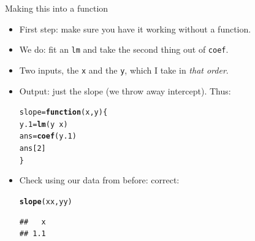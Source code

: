 \documentclass[unknownkeysallowed]{beamer}\usepackage[]{graphicx}\usepackage[]{color}
\makeatletter
\newcommand{\hlnum}[1]{\textcolor[rgb]{0.686,0.059,0.569}{#1}}%
\newcommand{\hlopt}[1]{\textcolor[rgb]{0,0,0}{#1}}%
\newcommand{\hlstd}[1]{\textcolor[rgb]{0.345,0.345,0.345}{#1}}%
\newcommand{\hlkwa}[1]{\textcolor[rgb]{0.161,0.373,0.58}{\textbf{#1}}}%
\newcommand{\hlkwb}[1]{\textcolor[rgb]{0.69,0.353,0.396}{#1}}%
\newcommand{\hlkwc}[1]{\textcolor[rgb]{0.333,0.667,0.333}{#1}}%
\newcommand{\hlkwd}[1]{\textcolor[rgb]{0.737,0.353,0.396}{\textbf{#1}}}%
\newenvironment{kframe}{%
 \def\at@end@of@kframe{}%
 \ifinner\ifhmode%
  \def\at@end@of@kframe{\end{minipage}}%
  \begin{minipage}{\columnwidth}%
 \fi\fi%
 \def\FrameCommand##1{\hskip\@totalleftmargin \hskip-\fboxsep
 \colorbox{shadecolor}{##1}\hskip-\fboxsep
     \hskip-\linewidth \hskip-\@totalleftmargin \hskip\columnwidth}%
 \MakeFramed {\advance\hsize-\width
   \@totalleftmargin\z@ \linewidth\hsize
   \@setminipage}}%
 {\par\unskip\endMakeFramed%
 \at@end@of@kframe}
\newenvironment{knitrout}{}{} %
\makeatother
\begin{document}
\begin{frame}[fragile]{Making this into a function}
  
  \begin{itemize}
  \item First step: make sure you have it working without a
    function. 
  \item We do: fit an \texttt{lm} and take the second thing out of
    \texttt{coef}. 
  \item Two inputs, the \texttt{x} and the \texttt{y}, which I take in
    \emph{that order}.
  \item Output: just the slope (we throw away intercept). Thus:
    
\begin{knitrout}
\color{fgcolor}\begin{kframe}
\begin{alltt}
\hlstd{slope}\hlkwb{=}\hlkwa{function}\hlstd{(}\hlkwc{x}\hlstd{,}\hlkwc{y}\hlstd{) \{}
  \hlstd{y.1}\hlkwb{=}\hlkwd{lm}\hlstd{(y}\hlopt{~}\hlstd{x)}
  \hlstd{ans}\hlkwb{=}\hlkwd{coef}\hlstd{(y.1)}
  \hlstd{ans[}\hlnum{2}\hlstd{]}
\hlstd{\}}
\end{alltt}
\end{kframe}
\end{knitrout}
\item Check using our data from before: correct:
  
\begin{knitrout}
\color{fgcolor}\begin{kframe}
\begin{alltt}
\hlkwd{slope}\hlstd{(xx,yy)}
\end{alltt}
\begin{verbatim}
##   x 
## 1.1
\end{verbatim}
\end{kframe}
\end{knitrout}
  \end{itemize}
  
\end{frame}
\end{document}
